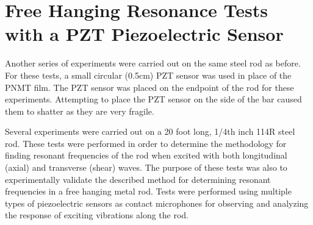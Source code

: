 \section{Free Hanging Resonance Tests with a PZT Piezoelectric Sensor}

Another series of experiments were carried out on the same steel rod as before. For these tests, a small circular (0.5cm) PZT sensor was used in place of the PNMT film. The PZT sensor was placed on the endpoint of the rod for these experiments. Attempting to place the PZT sensor on the side of the bar caused them to shatter as they are very fragile. 

Several experiments were carried out on a 20 foot long, 1/4th inch 114R steel rod. These tests were performed in order to determine the methodology for finding resonant frequencies of the rod when excited with both longitudinal (axial) and transverse (shear) waves. The purpose of these tests was also to experimentally validate the described method for determining resonant frequencies in a free hanging metal rod. Tests were performed using multiple types of piezoelectric sensors as contact microphones for observing and analyzing the response of exciting vibrations along the rod. 







